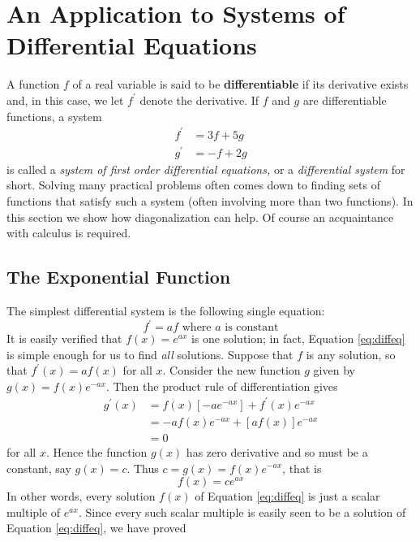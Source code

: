 \newpage
\section{An Application to Systems of Differential Equations}
\label{sec:3_5}

A function $f$ of a real variable is said to be \textbf{differentiable} if its derivative exists and, in this case, we let $f^{\prime}$ denote the derivative. If $f$ and $g$ are differentiable functions, a system
\begin{align*}
f^{\prime} &= 3f + 5g \\
g^{\prime} &= -f + 2g 
\end{align*}
is called a \textit{system of first order differential equations,} or a \textit{differential system} for short. Solving many practical problems often comes down to finding 
sets of functions that satisfy such a system (often involving more than 
two functions). In this section we show how diagonalization can help. Of
 course an acquaintance with calculus is required.


\subsection*{The Exponential Function}

The simplest differential system is the following single equation:
\begin{equation}\label{eq:diffeq}
f^{\prime} = af \mbox{ where } a \mbox{ is constant}
\end{equation}
It is easily verified that $f(x) = e ^{ax}$ is one solution; in fact, Equation \ref{eq:diffeq} is simple enough for us to find \textit{all} solutions. Suppose that $f$ is any solution, so that $f^{\prime}(x) = af(x)$ for all $x$. Consider the new function $g$ given by $g(x) = f(x)e^{-ax}$. Then the product rule of differentiation gives
\begin{align*}
g^{\prime}(x) & = f(x) \left[ -ae^{-ax} \right] + f^{\prime}(x) e^{-ax} \\
&= -af(x)e^{-ax} + \left[ af(x)\right] e^{-ax} \\
&= 0
\end{align*}
for all $x$. Hence the function $g(x)$ has zero derivative and so must be a constant, say $g(x) = c$. Thus $c = g(x) = f(x)e^{-ax}$, that is
\begin{equation*}
f(x) = ce^{ax}
\end{equation*}
In other words, every solution $f(x)$ of Equation \ref{eq:diffeq} is just a scalar multiple of $e^{ax}$. Since every such scalar multiple is easily seen to be a solution of Equation \ref{eq:diffeq}, we have proved


